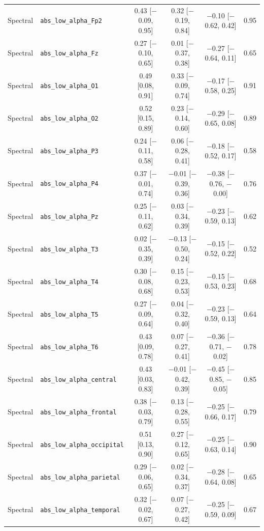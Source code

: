 {\begin{longtable}{llcccc}
Spectral & \texttt{abs\_low\_alpha\_Fp2} & 0.43 [$-$0.09, 0.95] & 0.32 [$-$0.19, 0.84] & $-$0.10 [$-$0.62, 0.42] & 0.95 \\
Spectral & \texttt{abs\_low\_alpha\_Fz} & 0.27 [$-$0.10, 0.65] & 0.01 [$-$0.37, 0.38] & $-$0.27 [$-$0.64, 0.11] & 0.65 \\
Spectral & \texttt{abs\_low\_alpha\_O1} & 0.49 [0.08, 0.91] & 0.33 [$-$0.09, 0.74] & $-$0.17 [$-$0.58, 0.25] & 0.91 \\
Spectral & \texttt{abs\_low\_alpha\_O2} & 0.52 [0.15, 0.89] & 0.23 [$-$0.14, 0.60] & $-$0.29 [$-$0.65, 0.08] & 0.89 \\
Spectral & \texttt{abs\_low\_alpha\_P3} & 0.24 [$-$0.11, 0.58] & 0.06 [$-$0.28, 0.41] & $-$0.18 [$-$0.52, 0.17] & 0.58 \\
Spectral & \texttt{abs\_low\_alpha\_P4} & 0.37 [$-$0.01, 0.74] & $-$0.01 [$-$0.39, 0.36] & $-$0.38 [$-$0.76, $-$0.00] & 0.76 \\
Spectral & \texttt{abs\_low\_alpha\_Pz} & 0.25 [$-$0.11, 0.62] & 0.03 [$-$0.34, 0.39] & $-$0.23 [$-$0.59, 0.13] & 0.62 \\
Spectral & \texttt{abs\_low\_alpha\_T3} & 0.02 [$-$0.35, 0.39] & $-$0.13 [$-$0.50, 0.24] & $-$0.15 [$-$0.52, 0.22] & 0.52 \\
Spectral & \texttt{abs\_low\_alpha\_T4} & 0.30 [$-$0.08, 0.68] & 0.15 [$-$0.23, 0.53] & $-$0.15 [$-$0.53, 0.23] & 0.68 \\
Spectral & \texttt{abs\_low\_alpha\_T5} & 0.27 [$-$0.09, 0.64] & 0.04 [$-$0.32, 0.40] & $-$0.23 [$-$0.59, 0.13] & 0.64 \\
Spectral & \texttt{abs\_low\_alpha\_T6} & 0.43 [0.09, 0.78] & 0.07 [$-$0.27, 0.41] & $-$0.36 [$-$0.71, $-$0.02] & 0.78 \\
Spectral & \texttt{abs\_low\_alpha\_central} & 0.43 [0.03, 0.83] & $-$0.01 [$-$0.42, 0.39] & $-$0.45 [$-$0.85, $-$0.05] & 0.85 \\
Spectral & \texttt{abs\_low\_alpha\_frontal} & 0.38 [$-$0.03, 0.79] & 0.13 [$-$0.28, 0.55] & $-$0.25 [$-$0.66, 0.17] & 0.79 \\
Spectral & \texttt{abs\_low\_alpha\_occipital} & 0.51 [0.13, 0.90] & 0.27 [$-$0.12, 0.65] & $-$0.25 [$-$0.63, 0.14] & 0.90 \\
Spectral & \texttt{abs\_low\_alpha\_parietal} & 0.29 [$-$0.06, 0.65] & 0.02 [$-$0.34, 0.37] & $-$0.28 [$-$0.64, 0.08] & 0.65 \\
Spectral & \texttt{abs\_low\_alpha\_temporal} & 0.32 [$-$0.02, 0.67] & 0.07 [$-$0.27, 0.42] & $-$0.25 [$-$0.59, 0.09] & 0.67 \\

\end{longtable}}
